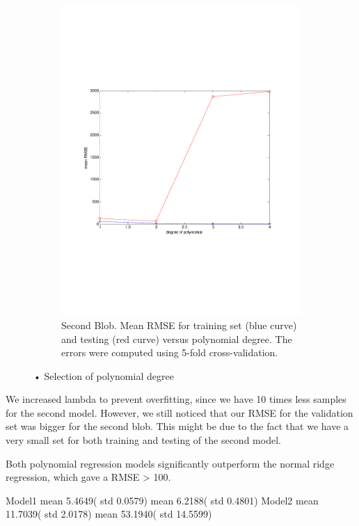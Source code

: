 \documentclass{article} %
\begin{document}
\begin{figure}[h]
\begin{subfigure}[b]{0.45\textwidth}
    \includegraphics[width=\textwidth]{figures/degree_polynomial_blob2_crop.pdf}
    \caption{Second Blob. Mean RMSE for training set (blue curve) and testing (red curve) versus polynomial degree. The errors were computed using 5-fold cross-validation.}
    \label{fig:degre_blob2}
  \end{subfigure}
  \caption{• Selection of polynomial degree}
\end{figure}

We increased lambda to prevent overfitting, since we have 10 times less samples for the second model. However, we still noticed that our RMSE for the validation set  was  bigger for the second blob. This might be due to the fact that we have a very small set for both training and testing of the second model.

Both polynomial regression models significantly outperform the normal ridge regression, which gave a RMSE > 100.

Model1 mean  5.4649( std 0.0579) mean 6.2188( std 0.4801)
Model2 mean   11.7039( std 2.0178) mean  53.1940( std 14.5599)
\end{document}
